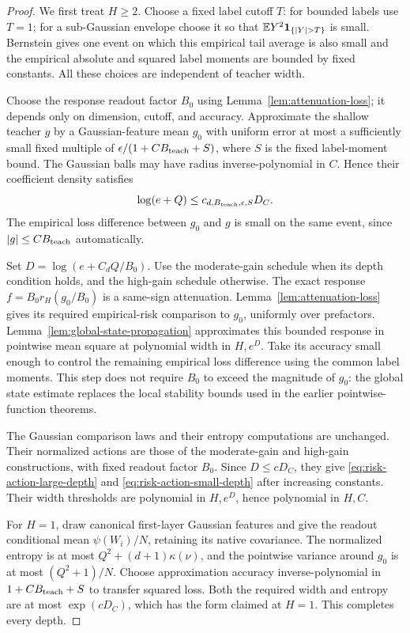 \begin{proof}
We first treat $H\ge2$. Choose a fixed label cutoff $T$: for bounded labels use $T=1$; for a sub-Gaussian envelope choose it so that $\E Y^2\mathbf1_{\{|Y|>T\}}$ is small. Bernstein gives one event on which this empirical tail average is also small and the empirical absolute and squared label moments are bounded by fixed constants. All these choices are independent of teacher width.

Choose the response readout factor $B_0$ using Lemma~\ref{lem:attenuation-loss}; it depends only on dimension, cutoff, and accuracy. Approximate the shallow teacher $g$ by a Gaussian-feature mean $g_0$ with uniform error at most a sufficiently small fixed multiple of
$\epsilon/(1+CB_{\rm teach}+S)$, where $S$ is the fixed label-moment bound. The Gaussian balls may have radius inverse-polynomial in $C$. Hence their coefficient density satisfies
\[
 \log(e+Q)\le c_{d,B_{\rm teach},\epsilon,S}D_C.
\]
The empirical loss difference between $g_0$ and $g$ is small on the same event, since $|g|\le CB_{\rm teach}$ automatically.

Set $D=\log(e+C_dQ/B_0)$. Use the moderate-gain schedule when its depth condition holds, and the high-gain schedule otherwise. The exact response $f=B_0r_H(g_0/B_0)$ is a same-sign attenuation. Lemma~\ref{lem:attenuation-loss} gives its required empirical-risk comparison to $g_0$, uniformly over prefactors. Lemma~\ref{lem:global-state-propagation} approximates this bounded response in pointwise mean square at polynomial width in $H,e^D$. Take its accuracy small enough to control the remaining empirical loss difference using the common label moments. This step does not require $B_0$ to exceed the magnitude of $g_0$: the global state estimate replaces the local stability bounds used in the earlier pointwise-function theorems.

The Gaussian comparison laws and their entropy computations are unchanged. Their normalized actions are those of the moderate-gain and high-gain constructions, with fixed readout factor $B_0$. Since $D\le cD_C$, they give \eqref{eq:risk-action-large-depth} and \eqref{eq:risk-action-small-depth} after increasing constants. Their width thresholds are polynomial in $H,e^D$, hence polynomial in $H,C$.

For $H=1$, draw canonical first-layer Gaussian features and give the readout conditional mean $\psi(W_i)/N$, retaining its native covariance. The normalized entropy is at most $Q^2+(d+1)\kappa(\nu)$, and the pointwise variance around $g_0$ is at most $(Q^2+1)/N$. Choose approximation accuracy inverse-polynomial in $1+CB_{\rm teach}+S$ to transfer squared loss. Both the required width and entropy are at most $\exp(cD_C)$, which has the form claimed at $H=1$. This completes every depth.
\end{proof}
